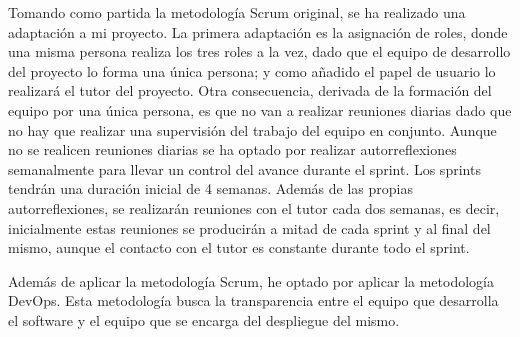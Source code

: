 Tomando como partida la metodología Scrum original, se ha realizado una adaptación a mi proyecto. La primera adaptación es la asignación de roles, donde una misma persona realiza los tres roles a la vez, dado que el equipo de desarrollo del proyecto lo forma una única persona; y como añadido el papel de usuario lo realizará el tutor del proyecto. Otra consecuencia, derivada de la formación del equipo por una única persona, es que no van a realizar reuniones diarias dado que no hay que realizar una supervisión del trabajo del equipo en conjunto. Aunque no se realicen reuniones diarias se ha optado por realizar autorreflexiones semanalmente para llevar un control del avance durante el sprint. Los sprints tendrán una duración inicial de 4 semanas. Además de las propias autorreflexiones, se realizarán reuniones con el tutor cada dos semanas, es decir, inicialmente estas reuniones se producirán a mitad de cada sprint y al final del mismo, aunque el contacto con el tutor es constante durante todo el sprint.

Además de aplicar la metodología Scrum, he optado por aplicar la metodología DevOps. Esta metodología busca la transparencia entre el equipo que desarrolla el software y el equipo que se encarga del despliegue del mismo.


